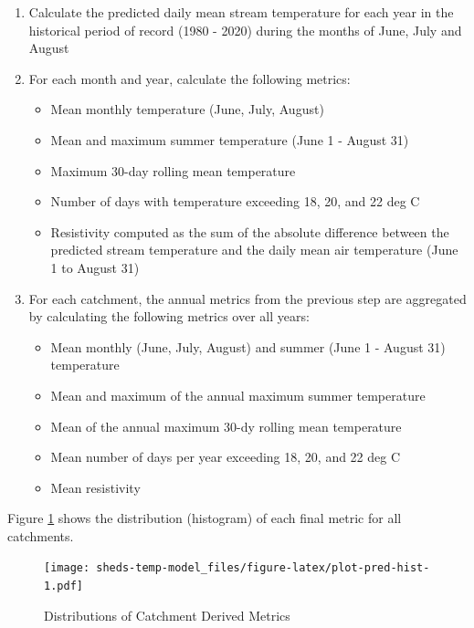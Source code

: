 \documentclass[]{book}
\providecommand{\tightlist}{%
  \setlength{\itemsep}{0pt}\setlength{\parskip}{0pt}}
\begin{document}
\begin{enumerate}
\def\labelenumi{\arabic{enumi}.}
\tightlist
\item
  Calculate the predicted daily mean stream temperature for each year in the historical period of record (1980 - 2020) during the months of June, July and August
\item
  For each month and year, calculate the following metrics:

  \begin{itemize}
  \tightlist
  \item
    Mean monthly temperature (June, July, August)
  \item
    Mean and maximum summer temperature (June 1 - August 31)
  \item
    Maximum 30-day rolling mean temperature
  \item
    Number of days with temperature exceeding 18, 20, and 22 deg C
  \item
    Resistivity computed as the sum of the absolute difference between the predicted stream temperature and the daily mean air temperature (June 1 to August 31)
  \end{itemize}
\item
  For each catchment, the annual metrics from the previous step are aggregated by calculating the following metrics over all years:

  \begin{itemize}
  \tightlist
  \item
    Mean monthly (June, July, August) and summer (June 1 - August 31) temperature
  \item
    Mean and maximum of the annual maximum summer temperature
  \item
    Mean of the annual maximum 30-dy rolling mean temperature
  \item
    Mean number of days per year exceeding 18, 20, and 22 deg C
  \item
    Mean resistivity
  \end{itemize}
\end{enumerate}

Figure \ref{fig:plot-pred-hist} shows the distribution (histogram) of each final metric for all catchments.

\begin{figure}
\centering
\texttt{[image: sheds-temp-model\_files/figure-latex/plot-pred-hist-1.pdf]}
\caption{\label{fig:plot-pred-hist}Distributions of Catchment Derived Metrics}
\end{figure}
\end{document}
